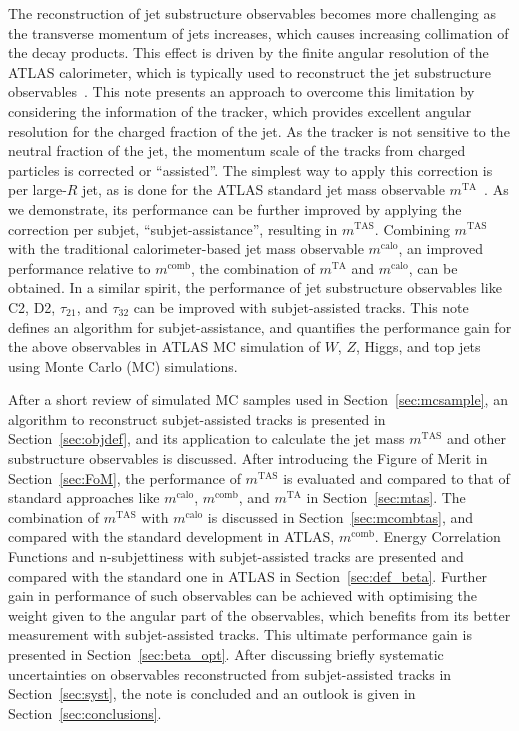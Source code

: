 \documentclass[UKenglish,texlive=2013]{\ATLASLATEXPATH atlasdoc}
\newcommand{\mta}{\ensuremath{m^\textrm{TA}}\xspace}
\newcommand{\mtas}{\ensuremath{m^\textrm{TAS}}\xspace}
\newcommand{\mcalo}{\ensuremath{m^\textrm{calo}}\xspace}
\newcommand{\mcomb}{\ensuremath{m^\textrm{comb}}\xspace}
\begin{document}
The reconstruction of jet substructure observables becomes more challenging as the transverse momentum of jets increases, which causes increasing collimation of the decay products. This effect is driven by the finite angular resolution of the ATLAS calorimeter, which is typically used to reconstruct the jet substructure observables~\cite{art35}. This note presents an approach to overcome this limitation by considering the information of the tracker, which provides excellent angular resolution for the charged fraction of the jet. As the tracker is not sensitive to the neutral fraction of the jet, the momentum scale of the tracks from charged particles is corrected or ``assisted''. The simplest way to apply this correction is per large-$R$ jet, as is done for the ATLAS standard jet mass observable \mta~\cite{art35}. As we demonstrate, its performance can be further improved by applying the correction per subjet, ``subjet-assistance'', resulting in \mtas. Combining \mtas with the traditional calorimeter-based jet mass observable \mcalo, an improved performance relative to \mcomb, the combination of \mta and \mcalo, can be obtained.
In a similar spirit, the performance of jet substructure observables like C2, D2, $\tau_{21}$, and $\tau_{32}$ can be improved with subjet-assisted tracks. This note defines an algorithm for subjet-assistance, and quantifies the performance gain for the above observables in ATLAS MC simulation of $W$, $Z$, Higgs, and top jets using Monte Carlo (MC) simulations. 

After a short review of simulated MC samples used in Section~\ref{sec:mcsample}, an algorithm to reconstruct subjet-assisted tracks is presented in Section~\ref{sec:objdef}, and its application to calculate the jet mass \mtas and other substructure observables is discussed. After introducing the Figure of Merit in Section~\ref{sec:FoM}, the performance of \mtas is evaluated and compared to that of standard approaches like \mcalo, \mcomb, and \mta in Section~\ref{sec:mtas}. The combination of \mtas with \mcalo is discussed in Section~\ref{sec:mcombtas}, and compared with the standard development in ATLAS, \mcomb. Energy Correlation Functions and n-subjettiness with subjet-assisted tracks are presented and compared with the standard one in ATLAS in Section~\ref{sec:def_beta}. Further gain in performance of such observables can be achieved with optimising the weight given to the angular part of the observables, which benefits from its better measurement with subjet-assisted tracks. This ultimate performance gain is presented in Section~\ref{sec:beta_opt}. After discussing briefly systematic uncertainties on observables reconstructed from subjet-assisted tracks in Section~\ref{sec:syst}, the note is concluded and an outlook is given in Section~\ref{sec:conclusions}.
\end{document}
